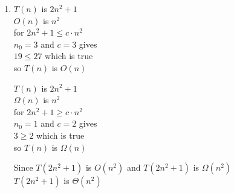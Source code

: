 \documentclass[11pt]{article}
\begin{document}
\begin{enumerate}[label=(\arabic*)\setlength{\listparindent}{\parindent}]
      \item 
$T(n)$ is $2n^2+1$\\
\vspace{5pt} 
$O(n)$ is $n^2$\\
\vspace{5pt} 
for $2n^2+1 \leq c \cdot n^2$\\
\vspace{5pt} 
 $n_{0} = 3$ and $c = 3$ gives  \\
\vspace{5pt} 
$19 \leq 27$ which is true \\
\vspace{5pt} 
so $T(n)$ is $O(n)$\\
\begin{center}
\vspace{-130pt}
$T(n)$ is $2n^2+1$\\ 
\vspace{5pt} 
$\Omega(n)$ is $n^2$\\
\vspace{5pt} 
for $2n^2+1 \geq c \cdot n^2$\\
\vspace{5pt} 
$n_{0} = 1$ and $c = 2$ gives  \\
\vspace{5pt} 
$3 \geq 2$ which is true \\
\vspace{5pt} 
so $T(n)$ is $\Omega(n)$
\end{center}
Since $T(2n^2+1)$ is $O(n^2)$ and $T(2n^2+1)$ is $\Omega(n^2)$ \\
\vspace{5pt}
$T(2n^2+1)$ is $\Theta(n^2)$


\noindent\makebox[\linewidth]{\rule{\paperwidth}{0.4pt}}


\end{enumerate}
\end{document}
